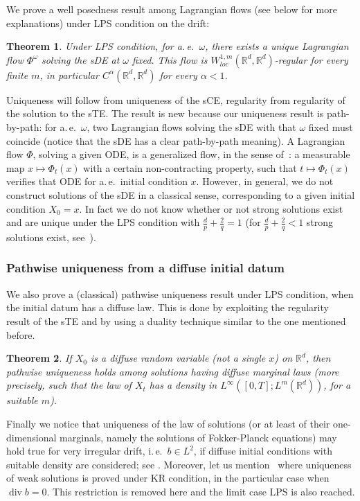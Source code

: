 \documentclass[a4paper,10pt]{article}
\newtheorem{theorem}{Theorem}
\newcommand{\mr}{\mathbb{R}}
\begin{document}
We prove a well posedness result among Lagrangian flows (see below for more explanations) under LPS condition on the drift:

\begin{theorem}
Under LPS condition, for a.\,e.\ $\omega$, there exists a unique Lagrangian flow $\Phi^\omega$ solving the sDE at $\omega$ fixed. This flow is $W_{loc}^{1,m}(\mathbb{R}^{d},\mathbb{R}^{d})$-regular for every finite $m$, in particular $C^\alpha(\mathbb{R}^{d},\mathbb{R}^{d})$ for every $\alpha<1$.
\end{theorem}

Uniqueness will follow from uniqueness of the sCE, regularity from regularity of the solution to the sTE. The result is new because our uniqueness result is path-by-path: for a.\,e.\ $\omega$, two Lagrangian flows solving the sDE with that $\omega$ fixed must coincide (notice that the sDE has a clear path-by-path meaning). A Lagrangian flow $\Phi$, solving a given ODE, is a generalized flow, in the sense of~\cite{DIPELI89,AMBROSIO04}: a measurable map $x\mapsto\Phi_{t}(x)$ with a certain non-contracting property, such that $t\mapsto\Phi_{t}(x)$ verifies that ODE for a.\,e.\ initial condition $x$. However, in general, we do not construct solutions of the sDE in a classical sense, corresponding to a given initial condition $X_{0}=x$. In fact we do not know whether or not 
strong solutions exist and are unique under the LPS condition with $\frac{d}{p}+\frac{2}{q}=1$ (for $\frac {d}{p}+\frac{2}{q}<1$ strong solutions exist, see~\cite{KRYROE05}).

\subsubsection{Pathwise uniqueness from a diffuse initial datum}

We also prove a (classical) pathwise uniqueness result under LPS condition, when the initial datum has a diffuse law. This is done by exploiting the regularity result of the sTE and by using a duality technique similar to the one mentioned before.

\begin{theorem}
If $X_0$ is a diffuse random variable (not a single $x$) on $\mr^d$, then pathwise uniqueness holds among solutions having diffuse marginal laws (more precisely, such that the law of $X_t$ has a density in $L^\infty([0,T];L^m(\mr^d))$, for a suitable $m$).
\end{theorem}

Finally we notice that uniqueness of the law of solutions (or at least of
their one-dimensional marginals, namely the solutions of Fokker-Planck
equations) may hold true for very irregular drift, i.\,e.\ $b\in L^{2}$, if
diffuse initial conditions with suitable density are considered; see \cite{Fig08,BogDaPRoe11}. Moreover, let us mention~\cite{NevOli} 
where uniqueness of weak solutions is proved under KR condition, in the 
particular case when $\operatorname{div}b=0$. This restriction is removed here 
and the limit case LPS is also reached.
\end{document}
